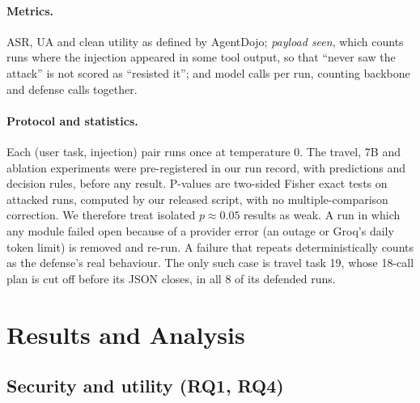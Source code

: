 \documentclass[11pt]{article}
\begin{document}
\paragraph{Metrics.}
ASR, UA and clean utility as defined by AgentDojo; \emph{payload seen}, which counts runs where the injection appeared in some tool output, so that ``never saw the attack'' is not scored as ``resisted it''; and model calls per run, counting backbone and defense calls together.

\paragraph{Protocol and statistics.}
\label{sec:protocol}
Each (user task, injection) pair runs once at temperature 0. The travel, 7B and ablation experiments were pre-registered in our run record, with predictions and decision rules, before any result. P-values are two-sided Fisher exact tests on attacked runs, computed by our released script, with no multiple-comparison correction. We therefore treat isolated $p\approx0.05$ results as weak. A run in which any module failed open because of a provider error (an outage or Groq's daily token limit) is removed and re-run. A failure that repeats deterministically counts as the defense's real behaviour. The only such case is travel task 19, whose 18-call plan is cut off before its JSON closes, in all 8 of its defended runs.

\section{Results and Analysis}
\label{sec:results}

\subsection{Security and utility (RQ1, RQ4)}
\label{sec:main}

\begin{table}[t]
\centering\small
{}
\caption{Main results on AgentDojo (\textit{important\_instructions}, N=1, temperature 0). Banking and Slack are held-out splits; for revisions 3--5 these are post hoc (Table~\ref{tab:revisions}). Travel was pre-registered and never tuned on. The 4B ``no defense'' banking and Slack rows are the laptop runs. Generated by \texttt{scripts/make\_figures.py}.}
\label{tab:main}
\end{table}
\end{document}
